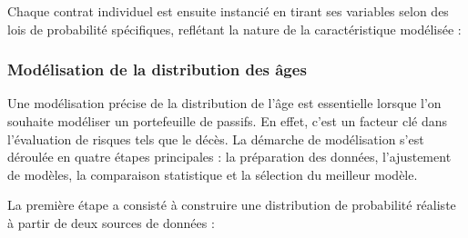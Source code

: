 Chaque contrat individuel est ensuite instancié en tirant ses variables selon des lois de probabilité spécifiques, reflétant la nature de la caractéristique modélisée :
\subsubsection{Modélisation de la distribution des âges}
Une modélisation précise de la distribution de l'âge est essentielle lorsque l'on souhaite modéliser un portefeuille de passifs. En effet, c'est un facteur clé dans l'évaluation de risques tels que le décès. La démarche de modélisation s'est déroulée en quatre étapes principales : la préparation des données, l'ajustement de modèles, la comparaison statistique et la sélection du meilleur modèle.

La première étape a consisté à construire une distribution de probabilité réaliste à partir de deux sources de données :
